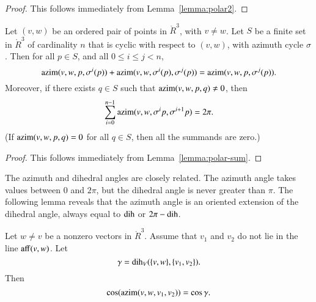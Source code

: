 \begin{proof} This follows immediately from Lemma~\ref{lemma:polar2}.
\end{proof}

\begin{lemma} \label{lemma:2pi-sum}
Let $(v,w)$ be an ordered pair of points in $\ring{R}^3$,
with $v\ne w$.  Let $S$ be a finite set in $\ring{R}^3$ of
cardinality $n$ that
is cyclic with respect to $(v,w)$,
with azimuth cycle $\sigma$.
Then for all $p\in S$,
and all $0\le i \le j < n$,
   $$
   {\operatorname{azim}}(v,w,p,\sigma^i(p)) +
    {\operatorname{azim}}(v,w,\sigma^i(p),\sigma^j(p)) =
   {\operatorname{azim}}(v,w,p,\sigma^j(p)).
   $$
Moreover, if there exists $q\in S$ such that 
${\operatorname{azim}}(v,w,p,q)\ne0$,
then
  $$
  \sum_{i=0}^{n-1} {\operatorname{azim}}(v,w,\sigma^ip,\sigma^{i+1}p) = 2\pi.
  $$
(If ${\operatorname{azim}}(v,w,p,q)=0$ for all $q\in S$, then all the
summands are zero.)
\end{lemma}

\begin{proof} This follows immediately from 
Lemma~\ref{lemma:polar-sum}.
\end{proof}


The azimuth and dihedral angles are closely related.   
The azimuth angle takes values between $0$ and $2\pi$, but the dihedral
angle is never greater than $\pi$.  The following lemma reveals that
the azimuth angle is an oriented extension of the dihedral angle, always
equal to $\operatorname{dih}$ or $2\pi - \operatorname{dih}$.


\begin{lemma}\label{lemma:dih-azim}
Let $w\ne v$ be a nonzero vectors in $\ring{R}^3$.
  Assume that $v_1$ and $v_2$ do not lie in the line ${\operatorname{aff}}(v,w)$.
Let
  $$\gamma = \operatorname{dih}_V(\{v,w\},\{v_1,v_2\}).$$
  Then
    $$
    \cos({\operatorname{azim}}(v,w,v_1,v_2)) = \cos\gamma.
    $$
\end{lemma}

